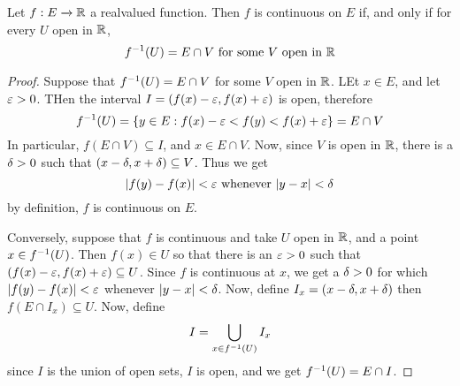 \begin{lemma}\label{1.4.2}
    Let $f:E \xrightarrow{} \mathbb{R}$ a realvalued function. Then $f$ is continuous on
     $E$ if, and only if for every  $U$ open in $\mathbb{R}$,
     \begin{equation*}
         f^{-1}(U)=E \cap V \text{ for some } V \text{ open in } \mathbb{R}
     \end{equation*}
\end{lemma}
\begin{proof}
    Suppose that $f^{-1}(U)=E \cap V$ for some $V$ open in  $\mathbb{R}$. LEt  $x \in
    E$, and let  $\varepsilon>0$. THen the interval  $I=(f(x)-\varepsilon,f(x)+\varepsilon)$ is open,
    therefore
    \begin{equation*}
        f^{-1}(U)=\{y \in E : f(x)-\varepsilon<f(y)<f(x)+\varepsilon\}=E \cap V
    \end{equation*}
    In particular, $f(E \cap V) \subseteq I$, and $x \in E \cap V$. Now, since
    $V$ is open in  $\mathbb{R}$, there is a  $\delta>0$ such that  $(x-\delta,x+\delta) \subseteq
    V$. Thus we get
    \begin{equation*}
        |f(y)-f(x)|<\varepsilon \text{ whenever } |y-x|<\delta
    \end{equation*}
    by definition, $f$ is continuous on $E$.

    Conversely, suppose that $f$ is continuous and take  $U$ open in  $\mathbb{R}$, and
    a point  $x \in f^{-1}(U)$. Then $f(x) \in U$ so that there is an $\varepsilon>0$
    such that  $(f(x)-\varepsilon,f(x)+\varepsilon) \subseteq U$. Since $f$ is continuous at  $x$,
    we get a  $\delta>0$ for which  $|f(y)-f(x)|<\varepsilon$ whenever $|y-x|<\delta$. Now,
    define $I_x=(x-\delta,x+\delta)$ then $f(E \cap I_x) \subseteq U$. Now, define
    \begin{equation*}
        I=\bigcup_{x \in f^{-1}(U)}{I_x}
    \end{equation*}
    since $I$ is the union of open sets, $I$ is open, and we get $f^{-1}(U)=E
    \cap I$.
\end{proof}

